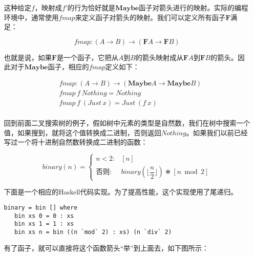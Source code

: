 \documentclass{article}
\begin{document}
\begin{example}
这种给定$f$，映射成$f'$的行为恰好就是$\mathbf{Maybe}$函子对箭头进行的映射。实际的编程环境中，通常使用$fmap$来定义函子对箭头的映射。我们可以定义所有函子$\mathbf{F}$满足：

\[
fmap : (A \to B) \to (\mathbf{F} A \to \mathbf{F} B)
\]

也就是说，如果$\mathbf{F}$是一个函子，它把从$A$到$B$的箭头映射成从$\mathbf{F} A$到$\mathbf{F} B$的箭头。因此对于$\mathbf{Maybe}$函子，相应的$fmap$定义如下：

\[
\begin{array}{l}
\quad    fmap : (A \to B) \to (\mathbf{Maybe} A \to \mathbf{Maybe} B) \\
\quad    fmap\ f\ Nothing = Nothing \\
\quad    fmap\ f\ (Just\ x) = Just\ (f\ x) \\
\end{array}
\]

回到前面二叉搜索树的例子，假如树中元素的类型是自然数，我们在树中搜索一个值，如果搜到，就将这个值转换成二进制，否则返回$Nothing$。如果我们以前已经写过一个将十进制自然数转换成二进制的函数：

\[
binary(n) = \begin{cases}
n < 2: & [n] \\
\text{否则}: & binary(\lfloor\dfrac{n}{2}\rfloor)\doubleplus[n \bmod 2]
\end{cases}
\]

下面是一个相应的Haskell代码实现。为了提高性能，这个实现使用了尾递归。

\lstset{frame=single}
\begin{lstlisting}[style=Haskell]
binary = bin [] where
   bin xs 0 = 0 : xs
   bin xs 1 = 1 : xs
   bin xs n = bin ((n `mod` 2) : xs) (n `div` 2)
\end{lstlisting}

有了函子，就可以直接将这个函数箭头“举”到上面去，如下图所示：

\begin{center}
\end{center}


\end{example}
\end{document}
